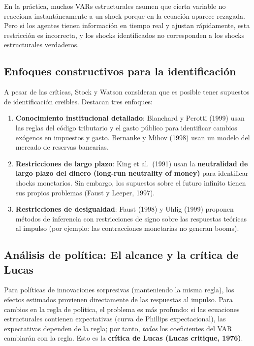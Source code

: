 \documentclass[12pt]{article}
\begin{document}
\begin{intuicion}
En la pr\'actica, muchos VARs estructurales asumen que cierta variable no reacciona instant\'aneamente a un shock porque en la ecuaci\'on aparece rezagada. Pero si los agentes tienen informaci\'on en tiempo real y ajustan r\'apidamente, esta restricci\'on es incorrecta, y los shocks identificados no corresponden a los shocks estructurales verdaderos.
\end{intuicion}

\subsection{Enfoques constructivos para la identificaci\'on}

A pesar de las cr\'iticas, Stock y Watson consideran que es posible tener supuestos de identificaci\'on creibles. Destacan tres enfoques:

\begin{enumerate}
  \item \textbf{Conocimiento institucional detallado}: Blanchard y Perotti (1999) usan las reglas del c\'odigo tributario y el gasto p\'ublico para identificar cambios ex\'ogenos en impuestos y gasto. Bernanke y Mihov (1998) usan un modelo del mercado de reservas bancarias.

  \item \textbf{Restricciones de largo plazo}: King et al.\ (1991) usan la \textbf{neutralidad de largo plazo del dinero (long-run neutrality of money)} para identificar shocks monetarios. Sin embargo, los supuestos sobre el futuro infinito tienen sus propios problemas (Faust y Leeper, 1997).

  \item \textbf{Restricciones de desigualdad}: Faust (1998) y Uhlig (1999) proponen m\'etodos de inferencia con restricciones de signo sobre las respuestas te\'oricas al impulso (por ejemplo: las contracciones monetarias no generan booms).
\end{enumerate}

\subsection{An\'alisis de pol\'itica: El alcance y la cr\'itica de Lucas}

Para pol\'iticas de innovaciones sorpresivas (manteniendo la misma regla), los efectos estimados provienen directamente de las respuestas al impulso. Para cambios en la regla de pol\'itica, el problema es m\'as profundo: si las ecuaciones estructurales contienen expectativas (curva de Phillips expectacional), las expectativas dependen de la regla; por tanto, \textit{todos} los coeficientes del VAR cambiar\'an con la regla. Esto es la \textbf{cr\'itica de Lucas (Lucas critique, 1976)}.
\end{document}
